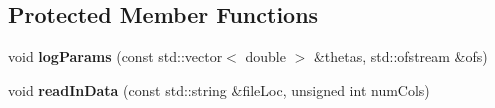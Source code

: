 \subsection*{Protected Member Functions}
\begin{DoxyCompactItemize}
\item 
void {\bfseries log\+Params} (const std\+::vector$<$ double $>$ \&thetas, std\+::ofstream \&ofs)\hypertarget{classAdaPmmh_a13e064d67c713f77dfd3b03ffab7176f}{}\label{classAdaPmmh_a13e064d67c713f77dfd3b03ffab7176f}

\item 
void {\bfseries read\+In\+Data} (const std\+::string \&file\+Loc, unsigned int num\+Cols)\hypertarget{classAdaPmmh_a53a380577a20ac1b71e05679bb92372e}{}\label{classAdaPmmh_a53a380577a20ac1b71e05679bb92372e}

\end{DoxyCompactItemize}
